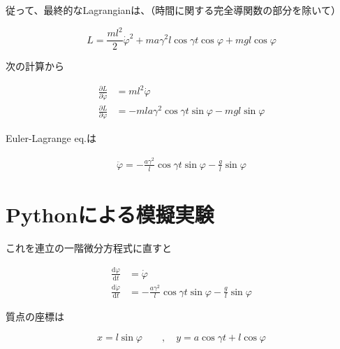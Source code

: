 従って、最終的なLagrangianは、（時間に関する完全導関数の部分を除いて）

\[L=\displaystyle\frac{ml^2}{2}\dot{\varphi}^2 + ma\gamma^2l\cos\gamma t\cos\varphi + mgl\cos\varphi\]

次の計算から

\begin{align*}
   \displaystyle\frac{\partial L}{\partial \dot{\varphi}}&=ml^2\dot{\varphi}\\
   \frac{\partial L}{\partial \varphi}&=-mla\gamma^2\cos\gamma t\sin\varphi -mgl\sin\varphi
\end{align*}

Euler-Lagrange eq.は

\begin{align*}
   \ddot{\varphi}=-\frac{a\gamma^2}{l}\cos\gamma t\sin\varphi - \frac{g}{l}\sin\varphi
\end{align*}

\section{Pythonによる模擬実験}

これを連立の一階微分方程式に直すと

\begin{align*}
   \frac{\mathrm{d}\varphi}{\mathrm{d}t} &= \dot{\varphi}\\
   \frac{\mathrm{d}\dot{\varphi}}{\mathrm{d}t} &= -\frac{a\gamma^2}{l}\cos\gamma t\sin\varphi - \frac{g}{l}\sin\varphi
\end{align*}

質点の座標は

\[x=l\sin\varphi \qquad,\quad y=a\cos\gamma t + l\cos\varphi\]

\lstset{escapechar=@,style=custompy}

